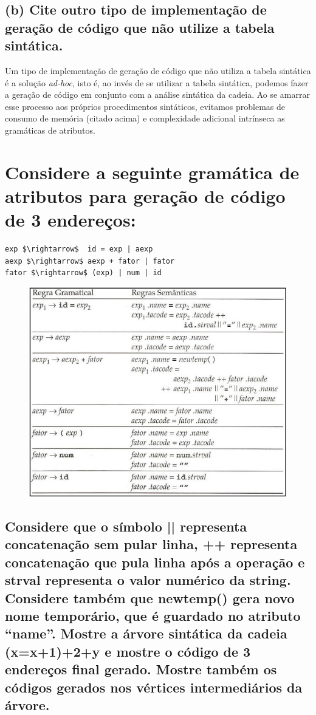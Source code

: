 \documentclass{article}
\begin{document}
\subsection{(b) Cite outro tipo de implementação de geração de código que não utilize a tabela sintática.}

Um tipo de implementação de geração de código que não utiliza a tabela sintática é a solução \textit{ad-hoc}, isto é, ao invés de se utilizar a tabela sintática, podemos fazer a geração de código em conjunto com a análise sintática da cadeia. Ao se amarrar esse processo aos próprios procedimentos sintáticos, evitamos problemas de consumo de memória (citado acima) e complexidade adicional intrínseca as gramáticas de atributos.

\section{Considere a seguinte gramática de atributos para geração de código de 3 endereços:}

\begin{lstlisting}
exp $\rightarrow$  id = exp | aexp
aexp $\rightarrow$ aexp + fator | fator
fator $\rightarrow$ (exp) | num | id
\end{lstlisting}

\begin{figure}[ht!]
	\centering
	\includegraphics[width=0.5\linewidth]{p2/tabela2.PNG}
\end{figure}

\subsection{Considere que o símbolo || representa concatenação sem pular linha, ++ representa concatenação que pula linha após a operação e strval representa o valor numérico da string. Considere também que newtemp() gera novo nome
temporário, que é guardado no atributo “name”. Mostre a árvore sintática da cadeia \textbf{(x=x+1)+2+y} e mostre o código
de 3 endereços final gerado. Mostre também os códigos gerados nos vértices intermediários da árvore.}
\end{document}
